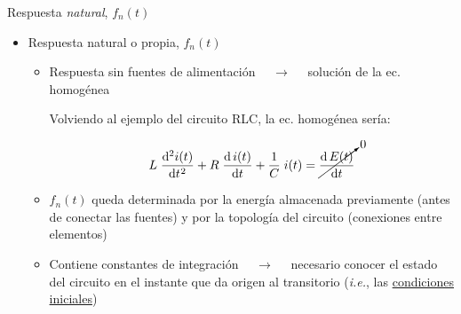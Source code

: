 \documentclass[aspectratio=169, usenames,svgnames,dvipsnames]{beamer}
\begin{document}
\begin{frame}{Respuesta \textit{natural}, \hspace{3mm}$f_n(t)$}
    
    \begin{itemize}
        \item Respuesta \alert{natural} o propia, \hspace{3mm}\(f_n(t)\)

        \vspace{4mm}
        \begin{itemize}
        \normalsize
            \item Respuesta \alert{sin fuentes de alimentación} $\quad\rightarrow\quad$ solución de la \alert{ec. homogénea}

            \vspace{2mm}
            Volviendo al ejemplo del circuito RLC, la ec. homogénea sería:

            \vspace{-3mm}
            \[
              L \; \diff[2]{i(t)}{t} + R \; \diff{\,i(t)}{t} + \frac{1}{C} \; i(t) = \cancelto{0}{\diff{\,E(t)}{t}}
            \]

            \vspace{3mm}
            \item \(f_n(t)\) queda determinada por la \alert{energía almacenada previamente} (antes de conectar las fuentes) y por la \alert{topología del circuito} (conexiones entre elementos)

            \vspace{3mm}
            \item Contiene constantes de integración $\quad\rightarrow\quad$ necesario conocer el \alert{estado del circuito} en el instante que da origen al transitorio (\textit{i.e.}, las \underline{condiciones iniciales})
        \end{itemize}
    \end{itemize}
\end{frame}

\end{document}
